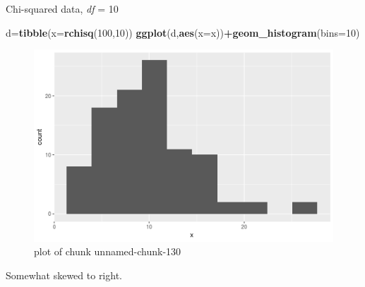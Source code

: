\documentclass[ignorenonframetext,]{beamer}
\newenvironment{Shaded}{\begin{snugshade}}{\end{snugshade}}
\newcommand{\DataTypeTok}[1]{\textcolor[rgb]{0.13,0.29,0.53}{#1}}
\newcommand{\DecValTok}[1]{\textcolor[rgb]{0.00,0.00,0.81}{#1}}
\newcommand{\KeywordTok}[1]{\textcolor[rgb]{0.13,0.29,0.53}{\textbf{#1}}}
\newcommand{\NormalTok}[1]{#1}
\newcommand{\OperatorTok}[1]{\textcolor[rgb]{0.81,0.36,0.00}{\textbf{#1}}}
\begin{document}
\begin{frame}[fragile]{Chi-squared data, \emph{df} = 10}
\protect\hypertarget{chi-squared-data-df-10}{}

\begin{Shaded}
\begin{Highlighting}[]
\NormalTok{d=}\KeywordTok{tibble}\NormalTok{(}\DataTypeTok{x=}\KeywordTok{rchisq}\NormalTok{(}\DecValTok{100}\NormalTok{,}\DecValTok{10}\NormalTok{))}
\KeywordTok{ggplot}\NormalTok{(d,}\KeywordTok{aes}\NormalTok{(}\DataTypeTok{x=}\NormalTok{x))}\OperatorTok{+}\KeywordTok{geom_histogram}\NormalTok{(}\DataTypeTok{bins=}\DecValTok{10}\NormalTok{)}
\end{Highlighting}
\end{Shaded}

\begin{figure}
\centering
\includegraphics{figure/unnamed-chunk-130-1.png}
\caption{plot of chunk unnamed-chunk-130}
\end{figure}

Somewhat skewed to right.

\end{frame}
\end{document}

